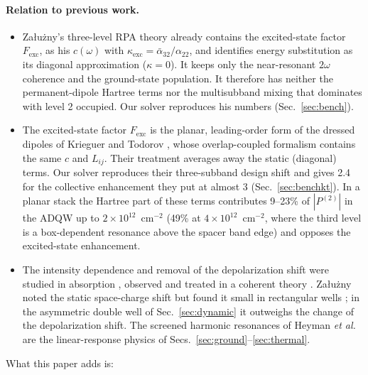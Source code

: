 \documentclass[11pt]{article}
\begin{document}
\paragraph{Relation to previous work.}
\begin{itemize}
\item Załużny's three-level RPA theory \cite{Zaluzny1995} already contains the excited-state factor $F_\mathrm{exc}$, as his $c(\omega)$ with $\kappa_\mathrm{exc}=\bar\alpha_{32}/\alpha_{22}$, and identifies energy substitution as its diagonal approximation ($\kappa=0$). It keeps only the near-resonant $2\omega$ coherence and the ground-state population. It therefore has neither the permanent-dipole Hartree terms nor the multisubband mixing that dominates with level 2 occupied. Our solver reproduces his numbers (Sec.~\ref{sec:bench}).
\item The excited-state factor $F_\mathrm{exc}$ is the planar, leading-order form of the dressed dipoles of Krieguer and Todorov \cite{Krieguer2024}, whose overlap-coupled formalism contains the same $c$ and $L_{ij}$. Their treatment averages away the static (diagonal) terms. Our solver reproduces their three-subband design shift and gives 2.4 for the collective enhancement they put at almost 3 (Sec.~\ref{sec:benchkt}). In a planar stack the Hartree part of these terms contributes 9--23\% of $|P^{(2)}|$ in the ADQW up to $2\times10^{12}$~cm$^{-2}$ (49\% at $4\times10^{12}$~cm$^{-2}$, where the third level is a box-dependent resonance above the spacer band edge) and opposes the excited-state enhancement.
\item The intensity dependence and removal of the depolarization shift were studied in absorption \cite{Zaluzny1993}, observed \cite{Craig1996} and treated in a coherent theory \cite{Cominotti2023}. Załużny noted the static space-charge shift but found it small in rectangular wells \cite{Zaluzny1993}; in the asymmetric double well of Sec.~\ref{sec:dynamic} it outweighs the change of the depolarization shift. The screened harmonic resonances of Heyman \emph{et al.}\ \cite{Heyman1994} are the linear-response physics of Secs.~\ref{sec:ground}--\ref{sec:thermal}.
\end{itemize}
What this paper adds is:
\end{document}
